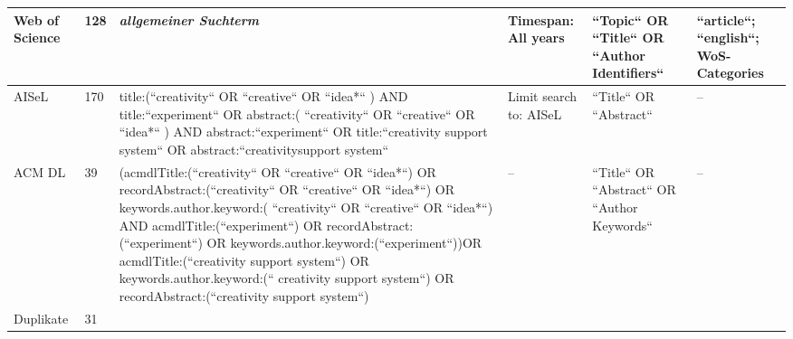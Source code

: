 \begin{table}[H]
{\begin{tabular}{L{0.1\textwidth}L{0.05\textwidth}p{0.56\textwidth}C{0.15\textwidth}L{0.20\textwidth}L{0.1\textwidth}}
Web of Science & 128              & \textit{allgemeiner Suchterm}                                                                                                                                                                                                                        & Timespan: All years         & ``Topic`` OR ``Title`` OR ``Author Identifiers`` & ``article``; ``english``; WoS-Categories \\ \midrule
AISeL                          & 170              & title:(``creativity`` OR ``creative`` OR ``idea*`` ) AND title:``experiment`` OR abstract:( ``creativity`` OR ``creative`` OR ``idea*`` ) AND abstract:``experiment`` OR title:``creativity support system`` OR abstract:``creativitysupport system``                                                                                                                                                                                                                          & Limit search to: AISeL         & ``Title`` OR ``Abstract``                        & --                                           \\ \midrule
ACM DL                         & 39               & (acmdlTitle:(``creativity`` OR ``creative`` OR ``idea*``) OR recordAbstract:(``creativity`` OR ``creative`` OR ``idea*``) OR keywords.author.keyword:( ``creativity`` OR ``creative`` OR ``idea*``) AND acmdlTitle:(``experiment``) OR recordAbstract:(``experiment``) OR keywords.author.keyword:(``experiment``))OR acmdlTitle:(``creativity support system``) OR keywords.author.keyword:(`` creativity support system``) OR recordAbstract:(``creativity support system``) & --         & ``Title`` OR ``Abstract`` OR ``Author Keywords`` & --                                           \\ \midrule
Duplikate                      & 31               &                                                                                                                                                                                                                                                                                                                                                                                                                                                                                &           &                                                  &                                             \\

\end{tabular}}
\end{table}
